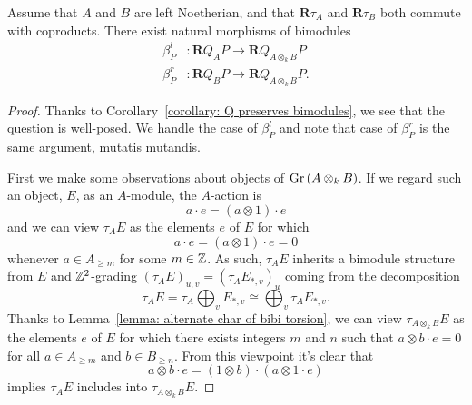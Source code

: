 \begin{corollary} \label{corollary: natural maps between Qs}
  Assume that \(A\) and \(B\) are left Noetherian, and that \(\mathbf{R}\tau_A\) and \(\mathbf{R}\tau_B\) both commute with coproducts. There exist natural morphisms of bimodules 
  \begin{align*}
    \beta^l_P & : \mathbf{R}Q_{A} P \to \mathbf{R}Q_{A \otimes_k B} P \\
    \beta^r_P & : \mathbf{R}Q_{B} P \to \mathbf{R}Q_{A \otimes_k B} P.
  \end{align*}
\end{corollary}

\begin{proof}%
  Thanks to Corollary~\ref{corollary: Q preserves bimodules}, we see that the question is well-posed. We handle the case of \(\beta^l_P\) and note that case of \(\beta^r_P\) is the same argument, mutatis mutandis.

  First we make some observations about objects of \(\operatorname{Gr}\left(A \otimes_k B\right)\).
  If we regard such an object, \(E\), as an \(A\)-module, the \(A\)-action is
  \[a \cdot e = (a \otimes 1) \cdot e\]
  and we can view \(\tau_A E\) as the elements \(e\) of \(E\) for which
  \[a \cdot e = (a \otimes 1) \cdot e = 0\]
  whenever \(a \in A_{\geq m}\) for some \(m \in \mathbb{Z}\).
  As such, \(\tau_A E\) inherits a bimodule structure from \(E\) and \(\mathbb{Z}^2\)-grading \((\tau_A E)_{u,v} = (\tau_A E_{*,v})_u\) coming from the decomposition
  \[\tau_A E = \tau_A \bigoplus_v E_{\ast,v} \cong \bigoplus_v \tau_A E_{\ast,v}.\]
  Thanks to Lemma~\ref{lemma: alternate char of bibi torsion}, we can view \(\tau_{A \otimes_k B} E\) as the elements \(e\) of \(E\) for which there exists integers \(m\) and \(n\) such that \(a \otimes b \cdot e = 0\) for all \(a \in A_{\geq m}\) and \(b \in B_{\geq n}\).
  From this viewpoint it's clear that
  \[a \otimes b \cdot e = (1 \otimes b) \cdot (a \otimes 1 \cdot e)\]
  implies \(\tau_A E\) includes into \(\tau_{A \otimes_k B} E\).


\end{proof}
